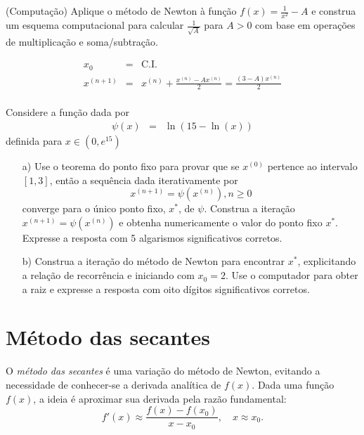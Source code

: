 \begin{exer}(Computação) Aplique o método de Newton à função $f(x)=\frac{1}{x^2}-A$ e construa um esquema computacional para calcular  $\frac{1}{\sqrt{A}}$ para $A>0$ com base em operações de multiplicação e soma/subtração.
\end{exer}
\begin{resp}
 \begin{eqnarray}
 x_{0} &=& \text{C.I.}\\
 x^{(n+1)}&=&x^{(n)} + \frac{x^{(n)}-Ax^{(n)}}{2}=\frac{(3-A)x^{(n)}}{2}\\
 \end{eqnarray}

\end{resp}




\begin{exer} Considere a função dada por
\begin{eqnarray}
\psi(x)&=&\ln\left(15-\ln(x)\right)
\end{eqnarray}
definida para $x\in \left(0,e^{15}\right)$
\begin{itemize}
\item [a)] Use o teorema do ponto fixo para provar que se $x^{(0)}$ pertence ao intervalo $[1,3]$, então a sequência dada iterativamente por \begin{equation} x^{(n+1)}=\psi(x^{(n)}),n\geq 0 \end{equation} converge para o único ponto fixo, $x^*$, de $\psi$. Construa a iteração $x^{(n+1)}=\psi(x^{(n)})$ e obtenha numericamente o valor do ponto fixo $x^*$. Expresse a resposta com 5 algarismos significativos corretos.
\item [b)] Construa a iteração do método de Newton para encontrar $x^*$, explicitando a relação de recorrência e iniciando com $x_0=2$. Use o computador para obter a raiz e expresse a resposta com oito dígitos significativos corretos.
\end{itemize}
\end{exer}

\section{Método das secantes}

O \emph{método das secantes} é uma variação do método de Newton, evitando a necessidade de conhecer-se a derivada analítica de $f(x)$. Dada uma função $f(x)$, a ideia é aproximar sua derivada pela razão fundamental:
\begin{equation}
  f'(x)\approx \frac{f(x)-f(x_0)}{x-x_0},\quad x\approx x_0.
\end{equation}


